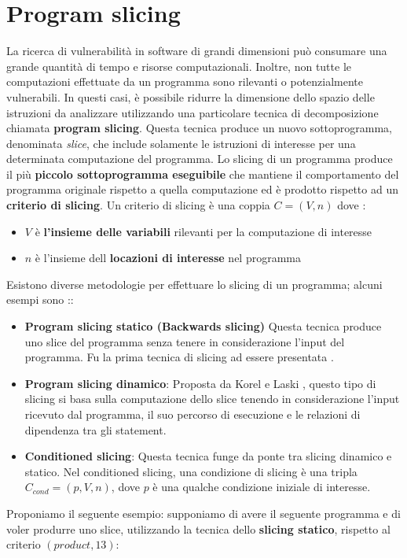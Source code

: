 \documentclass[../main.tex]{subfiles}
\begin{document}
\section{Program slicing}
La ricerca di vulnerabilità in software di grandi dimensioni può consumare una grande quantità di tempo e risorse computazionali.
Inoltre, non tutte le computazioni effettuate da un programma sono rilevanti o potenzialmente vulnerabili. 
In questi casi, è possibile ridurre la dimensione dello spazio delle istruzioni da analizzare utilizzando una particolare tecnica di decomposizione
chiamata \textbf{program slicing}.
Questa tecnica produce un nuovo sottoprogramma, denominata \textit{slice}, che include solamente le istruzioni di interesse per una determinata computazione del programma.
Lo slicing di un programma produce il più \textbf{piccolo sottoprogramma eseguibile} che mantiene il comportamento del programma originale rispetto a quella computazione ed è prodotto rispetto ad un \textbf{criterio di slicing}.
Un criterio di slicing è una coppia $C = (V, n)$ dove \cite{Sclicing}:
\begin{itemize}
    \item $V$ è \textbf{l'insieme delle variabili} rilevanti per la computazione di interesse
    \item $n$ è l'insieme dell \textbf{locazioni di interesse} nel programma 
\end{itemize}
Esistono diverse metodologie per effettuare lo slicing di un programma; alcuni esempi sono \cite{Sclicing}::
\begin{itemize}
    \item \textbf{Program slicing statico (Backwards slicing)} Questa tecnica produce uno slice del programma senza tenere in considerazione l'input del programma. Fu la prima tecnica di slicing ad essere presentata \cite{weiser1981program}.
    \item \textbf{Program slicing dinamico}: Proposta da Korel e Laski \cite{korel1988dynamic}, questo tipo di slicing si basa sulla computazione dello slice tenendo in considerazione l'input ricevuto dal programma, il suo percorso di esecuzione e le relazioni di dipendenza tra gli statement.
    \item \textbf{Conditioned slicing}: Questa tecnica funge da ponte tra slicing dinamico e statico. Nel conditioned slicing, una condizione di slicing è una tripla $C_{cond} = (p, V, n)$, dove $p$ è una qualche condizione iniziale di interesse.
\end{itemize}
\newpage \noindent
Proponiamo il seguente esempio: supponiamo di avere il seguente programma e di voler produrre uno slice, utilizzando la tecnica dello \textbf{slicing statico}, rispetto al criterio $(product, 13)$:


\end{document}
